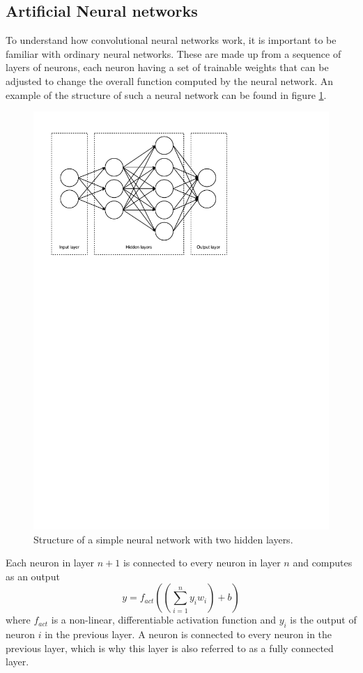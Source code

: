 \documentclass[12pt,a4paper,twoside,openright]{report}
\begin{document}
\subsection{Artificial Neural networks}
To understand how convolutional neural networks work, it is important to be familiar with ordinary neural networks. These are made up from a sequence of layers of neurons, each neuron having a set of trainable weights that can be adjusted to change the overall function computed by the neural network. An example of the structure of such a neural network can be found in figure \ref{fig:nn_layout}.
\begin{figure}
	\centering
	\includegraphics[scale=0.6]{nn_layout}
	\caption{Structure of a simple neural network with two hidden layers.}
	\label{fig:nn_layout}
\end{figure}

Each neuron in layer $n+1$ is connected to every neuron in layer $n$ and computes as an output
\[y = f_{act}((\sum_{i=1}^{n} y_i w_i) + b)\]
where $f_{act}$ is a non-linear, differentiable activation function and $y_i$ is the output of neuron $i$ in the previous layer. A neuron is connected to every neuron in the previous layer, which is why this layer is also referred to as a fully connected layer.
\end{document}

